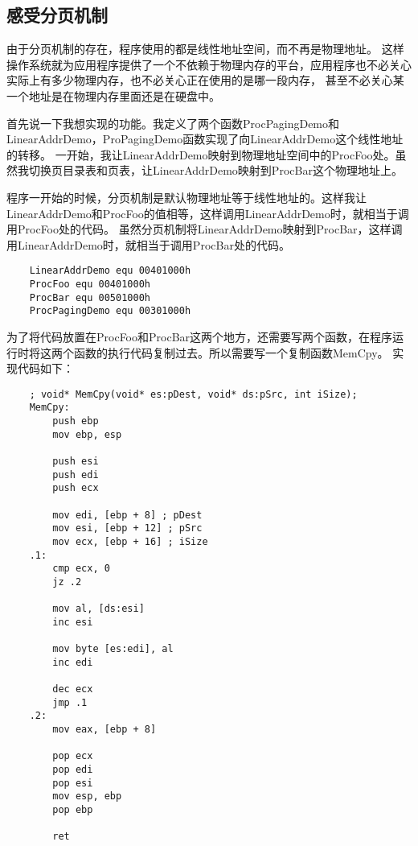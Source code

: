 \documentclass[a4paper,left=2.5cm,right=2.5cm,11pt]{article}
\begin{document}
\subsection{感受分页机制}
	由于分页机制的存在，程序使用的都是线性地址空间，而不再是物理地址。
	这样操作系统就为应用程序提供了一个不依赖于物理内存的平台，应用程序也不必关心实际上有多少物理内存，也不必关心正在使用的是哪一段内存，
	甚至不必关心某一个地址是在物理内存里面还是在硬盘中。\par
	首先说一下我想实现的功能。我定义了两个函数ProcPagingDemo和LinearAddrDemo，ProPagingDemo函数实现了向LinearAddrDemo这个线性地址的转移。
	一开始，我让LinearAddrDemo映射到物理地址空间中的ProcFoo处。虽然我切换页目录表和页表，让LinearAddrDemo映射到ProcBar这个物理地址上。\par
	程序一开始的时候，分页机制是默认物理地址等于线性地址的。这样我让LinearAddrDemo和ProcFoo的值相等，这样调用LinearAddrDemo时，就相当于调用ProcFoo处的代码。
	虽然分页机制将LinearAddrDemo映射到ProcBar，这样调用LinearAddrDemo时，就相当于调用ProcBar处的代码。\par
	\begin{lstlisting}
	LinearAddrDemo equ 00401000h
	ProcFoo equ 00401000h
	ProcBar equ 00501000h
	ProcPagingDemo equ 00301000h
	\end{lstlisting}

	为了将代码放置在ProcFoo和ProcBar这两个地方，还需要写两个函数，在程序运行时将这两个函数的执行代码复制过去。所以需要写一个复制函数MemCpy。
	实现代码如下：
	\begin{lstlisting}
	; void* MemCpy(void* es:pDest, void* ds:pSrc, int iSize);
	MemCpy:
		push ebp
		mov ebp, esp

		push esi
		push edi
		push ecx

		mov edi, [ebp + 8] ; pDest
		mov esi, [ebp + 12] ; pSrc
		mov ecx, [ebp + 16] ; iSize
	.1:
		cmp ecx, 0
		jz .2

		mov al, [ds:esi]
		inc esi

		mov byte [es:edi], al
		inc edi

		dec ecx
		jmp .1
	.2:
		mov eax, [ebp + 8]

		pop ecx
		pop edi
		pop esi
		mov esp, ebp
		pop ebp

		ret
	\end{lstlisting}
\end{document}
